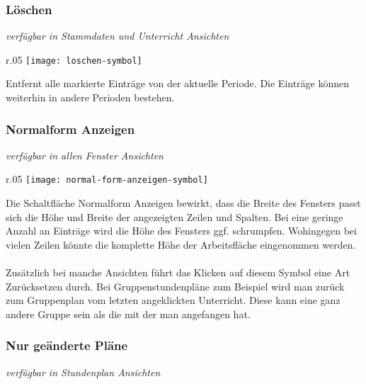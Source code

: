 \subsubsection{Löschen}
{\small\textit{verfügbar in Stammdaten und Unterricht Ansichten\\}\par}

\begin{wrapfigure}{r}{.05\textwidth}
	\vspace{-50pt}
	\texttt{[image: loschen-symbol]}
	\vspace{-35pt}
\end{wrapfigure}

\noindent
Entfernt alle markierte Einträge von der aktuelle Periode. Die Einträge können weiterhin in andere Perioden bestehen.\\

\subsubsection{Normalform Anzeigen}
{\small\textit{verfügbar in allen Fenster Ansichten\\}\par}

\begin{wrapfigure}{r}{.05\textwidth}
	\vspace{-50pt}
	\texttt{[image: normal-form-anzeigen-symbol]}
	\vspace{-35pt}
\end{wrapfigure}

\noindent
Die Schaltfläche Normalform Anzeigen bewirkt, dass die Breite des Fensters passt sich die Höhe und Breite der angezeigten Zeilen und Spalten. Bei eine geringe Anzahl an Einträge wird die Höhe des Fensters ggf. schrumpfen. Wohingegen bei vielen Zeilen könnte die komplette Höhe der Arbeitsfläche eingenommen werden.\\
\\
Zusätzlich bei manche Ansichten führt das Klicken auf diesem Symbol eine Art Zurücksetzen durch. Bei Gruppenstundenpläne zum Beispiel wird man zurück zum Gruppenplan vom letzten angeklickten Unterricht. Diese kann eine ganz andere Gruppe sein als die mit der man angefangen hat.\\

\subsubsection{Nur geänderte Pläne}
{\small\textit{verfügbar in Stundenplan Ansichten\\}\par}


